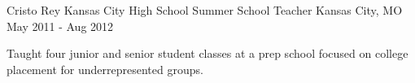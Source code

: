 \begin{cventries}

\cventry
{Cristo Rey Kansas City High School}
{Summer School Teacher}
{Kansas City, MO}
{May 2011 - Aug 2012}
{
\begin{cvitems}
\item Taught four junior and senior student classes at a prep school focused on college placement for underrepresented groups.
\end{cvitems}
}
\fi

\end{cventries}
